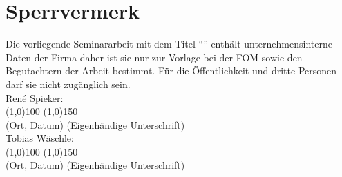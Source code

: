 \section*{Sperrvermerk}
Die vorliegende Seminararbeit mit dem Titel ``\MyTitel{}'' enthält unternehmensinterne Daten der Firma \MyFirma{} daher ist sie nur zur Vorlage bei der FOM sowie den Begutachtern der Arbeit bestimmt. Für die Öffentlichkeit und dritte Personen darf sie nicht zugänglich sein.
\\[3cm]
René Spieker:\\[1cm]
\line(1,0){100} \hfill \line(1,0){150}\\
(Ort, Datum) \hfill (Eigenhändige Unterschrift)\\[2cm]
Tobias Wäschle:\\[1cm]
\line(1,0){100} \hfill \line(1,0){150}\\
(Ort, Datum) \hfill (Eigenhändige Unterschrift)